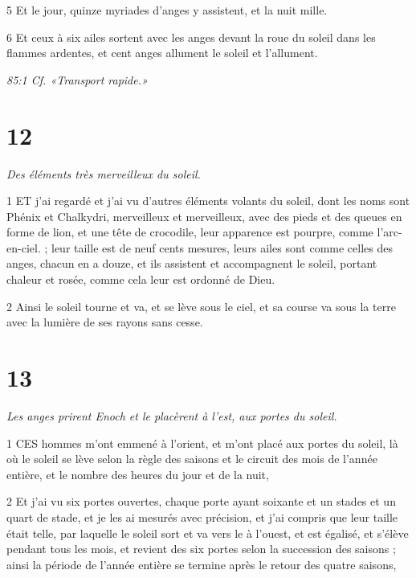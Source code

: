 \par 5 Et le jour, quinze myriades d'anges y assistent, et la nuit mille.

\par 6 Et ceux à six ailes sortent avec les anges devant la roue du soleil dans les flammes ardentes, et cent anges allument le soleil et l'allument.

\par \textit{85:1 Cf. «Transport rapide.»}

\chapter{12}

\par \textit{Des éléments très merveilleux du soleil.}

\par 1 ET j'ai regardé et j'ai vu d'autres éléments volants du soleil, dont les noms sont Phénix et Chalkydri, merveilleux et merveilleux, avec des pieds et des queues en forme de lion, et une tête de crocodile, leur apparence est pourpre, comme l'arc-en-ciel. ; leur taille est de neuf cents mesures, leurs ailes sont comme celles des anges, chacun en a douze, et ils assistent et accompagnent le soleil, portant chaleur et rosée, comme cela leur est ordonné de Dieu.

\par 2 Ainsi le soleil tourne et va, et se lève sous le ciel, et sa course va sous la terre avec la lumière de ses rayons sans cesse.

\chapter{13}

\par \textit{Les anges prirent Enoch et le placèrent à l'est, aux portes du soleil.}

\par 1 CES hommes m'ont emmené à l'orient, et m'ont placé aux portes du soleil, là où le soleil se lève selon la règle des saisons et le circuit des mois de l'année entière, et le nombre des heures du jour et de la nuit,

\par 2 Et j'ai vu six portes ouvertes, chaque porte ayant soixante et un stades et un quart de stade, et je les ai mesurés avec précision, et j'ai compris que leur taille était telle, par laquelle le soleil sort et va vers le à l'ouest, et est égalisé, et s'élève pendant tous les mois, et revient des six portes selon la succession des saisons ; ainsi la période de l'année entière se termine après le retour des quatre saisons,

